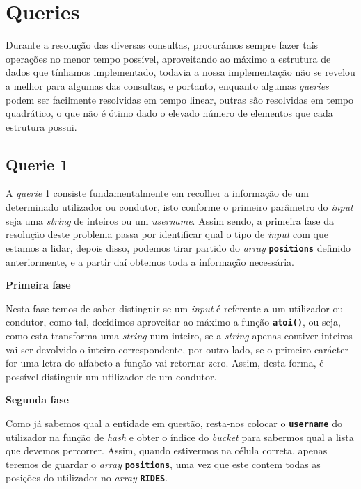 \documentclass[12pt,a4paper]{report}
\begin{document}
\chapter{Queries}

Durante a resolução das diversas consultas, procurámos sempre fazer tais operações no menor tempo possível, aproveitando ao máximo a estrutura de dados que tínhamos implementado, todavia a nossa implementação não se revelou a melhor para algumas das consultas, e portanto, enquanto algumas \textit{queries} podem ser facilmente resolvidas em tempo linear, outras são resolvidas em tempo quadrático, o que não é ótimo dado o elevado número de elementos que cada estrutura possui.

\section{Querie 1}

A \textit{querie} 1 consiste fundamentalmente em recolher a informação de um determinado utilizador ou condutor, isto conforme o primeiro parâmetro do \textit{input} seja uma \textit{string} de inteiros ou um \textit{username}. Assim sendo, a primeira fase da resolução deste problema passa por identificar qual o tipo de \textit{input} com que estamos a lidar, depois disso, podemos tirar partido do \textit{array} \textbf{\small\texttt{positions}} definido anteriormente, e a partir daí obtemos toda a informação necessária.    

\normalsize\textbf{Primeira fase }{\titlerule[0.5pt]}

Nesta fase temos de saber distinguir se um \textit{input} é referente a um utilizador ou condutor, como tal, decidimos aproveitar ao máximo a função \textbf{\small\texttt{atoi()}}, ou seja, como esta transforma uma \textit{string} num inteiro, se a \textit{string} apenas contiver inteiros vai ser devolvido o inteiro correspondente, por outro lado, se o primeiro carácter for uma letra do alfabeto a função vai retornar zero. Assim, desta forma, é possível distinguir um utilizador de um condutor.  

\normalsize\textbf{Segunda fase }{\titlerule[0.5pt]}

Como já sabemos qual a entidade em questão, resta-nos colocar o \textbf{\small\texttt{username}} do utilizador na função de \textit{hash} e obter o índice do \textit{bucket} para sabermos qual a lista que devemos percorrer. Assim, quando estivermos na célula correta, apenas teremos de guardar o \textit{array} \textbf{\small\texttt{positions}}, uma vez que este contem todas as posições do utilizador no \textit{array} \textbf{\small\texttt{RIDES}}.
\end{document}
